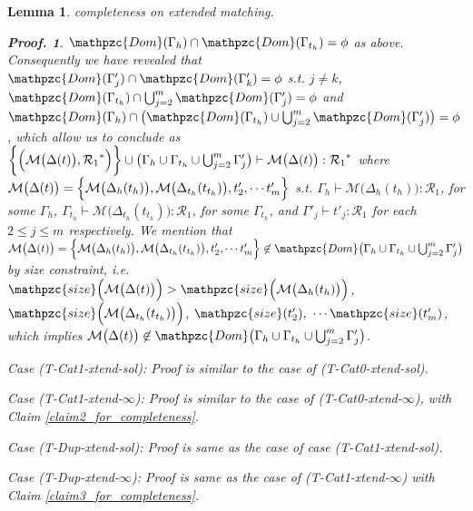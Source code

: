 \documentclass[12pt]{article}
\newtheorem{Lemma}{Lemma}[section]
\newtheorem{Proof}{Proof.}
\begin{document}
\begin{Lemma}{completeness on extended matching.}
\begin{Proof}
    $\mathpzc{Dom}(\Gamma_h) \cap \mathpzc{Dom}(\Gamma_{t_h}) = \phi$ as
    above. Consequently we have revealed that
    $\mathpzc{Dom}(\Gamma'_j) \cap \mathpzc{Dom}(\Gamma'_k) = \phi$ s.t.
    $j \neq k$,
    $\mathpzc{Dom}(\Gamma_{t_h}) \cap \bigcup_{j=2}^m \mathpzc{Dom}(
    \Gamma'_j) = \phi$ and
    $\mathpzc{Dom}(\Gamma_h) \cap \bigl(\mathpzc{Dom}(\Gamma_{t_h}) \cup
    \bigcup_{j=2}^m \mathpzc{Dom}(\Gamma'_j) \bigr) = \phi$, which
    allow us to conclude as
    $\biggl\{\Bigl(\mathcal{M}\bigl(\Delta(t) \bigr), {\mathcal{R}_1}^*
    \Bigr) \biggr\} \cup \bigl(\Gamma_h \cup \Gamma_{t_h} \cup
    \bigcup_{j=2}^m \Gamma'_j \bigr) \vdash
    \mathcal{M}\bigl(\Delta(t) \bigr) : {\mathcal{R}_1}^*$ where
    $\mathcal{M}\bigl(\Delta(t) \bigr) = \Bigl\{
    \mathcal{M}\bigl(\Delta_h(t_h) \bigr),
    \mathcal{M}\bigl(\Delta_{t_h}(t_{t_h}) \bigr), t'_2, \cdots t'_m
    \Bigr\}$ s.t.
    $\Gamma_h \vdash \mathcal{M}\bigl(\Delta_h(t_h) \bigr) :
    \mathcal{R}_1$, for some $\Gamma_h$,
    $\Gamma_{t_h} \vdash \mathcal{M}\bigl(\Delta_{t_h}(t_{t_h}) \bigr) :
    \mathcal{R}_1$, for some $\Gamma_{t_h}$, and
    $\Gamma'_j \vdash t'_j : \mathcal{R}_1$ for each $2 \le j \le m$
    respectively. We mention that
    $\mathcal{M}\bigl(\Delta(t) \bigr) = \Bigl\{
    \mathcal{M}\bigl(\Delta_h(t_h) \bigr),
    \mathcal{M}\bigl(\Delta_{t_h}(t_{t_h}) \bigr), t'_2, \cdots t'_m
    \Bigr\} \not\in \mathpzc{Dom}\bigl(\Gamma_h \cup \Gamma_{t_h} \cup
    \bigcup_{j=2}^m \Gamma'_j \bigr)$ by size constraint, i.e.
    $\mathpzc{size}\Bigl(\mathcal{M}\bigl(\Delta(t) \bigr) \Bigr) >
    \mathpzc{size}\Bigl(\mathcal{M}\bigl(\Delta_h(t_h) \bigr) \Bigr)$,
    $\mathpzc{size}\Bigl(\mathcal{M}\bigl(\Delta_{t_h}(t_{t_h}) \bigr)
    \Bigr)$, $\mathpzc{size}(t'_2),\ \cdots \mathpzc{size}(t'_m)$, which
    implies $\mathcal{M}\bigl(\Delta(t) \bigr) \not\in \mathpzc{Dom}\bigl(
    \Gamma_h \cup \Gamma_{t_h} \cup \bigcup_{j=2}^m \Gamma'_j \bigr)$.
    
    Case (T-Cat1-xtend-sol):
    Proof is similar to the case of (T-Cat0-xtend-sol).
    
    Case (T-Cat1-xtend-$\infty$):
    Proof is similar to the case of (T-Cat0-xtend-$\infty$), with Claim
    \ref{claim2_for_completeness}.
    
    Case (T-Dup-xtend-sol):
    Proof is same as the case of case (T-Cat1-xtend-sol).
    
    Case (T-Dup-xtend-$\infty$):
    Proof is same as the case of (T-Cat1-xtend-$\infty$) with Claim
    \ref{claim3_for_completeness}.
    

\end{Proof}
\end{Lemma}
\end{document}
